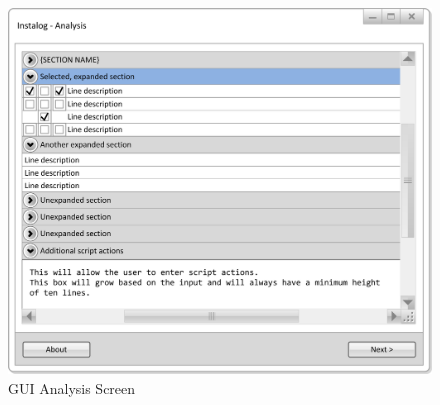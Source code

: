 \begin{figure}[!ht]
  	\centering
	\includegraphics{figures/gui/Analysis.png}
  	\caption{GUI Analysis Screen}
  	\label{fig:gui_analyze}
\end{figure}

